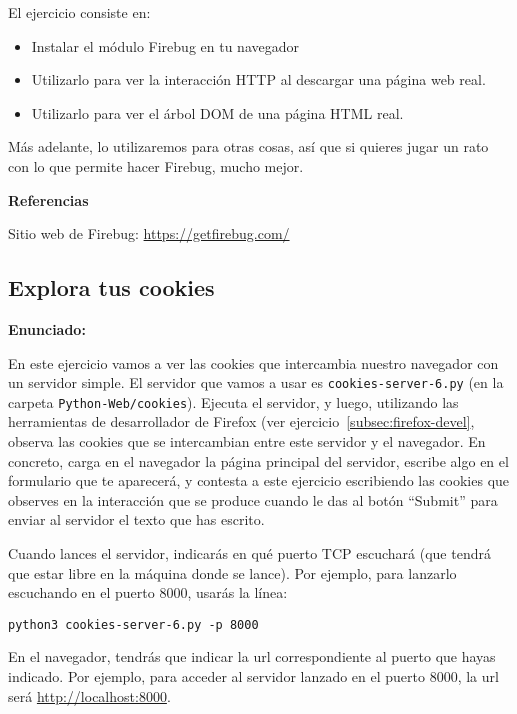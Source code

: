 El ejercicio consiste en:

\begin{itemize}
\item Instalar el módulo Firebug en tu navegador
\item Utilizarlo para ver la interacción HTTP al descargar una página web real.
\item Utilizarlo para ver el árbol DOM de una página HTML real.
\end{itemize}

Más adelante, lo utilizaremos para otras cosas, así que si quieres jugar un rato con lo que permite hacer Firebug, mucho mejor.

\textbf{Referencias}

Sitio web de Firebug: \url{https://getfirebug.com/}


\subsection{Explora tus cookies}
\label{subsec:explora-cookies}

\textbf{Enunciado:}

En este ejercicio vamos a ver las cookies que intercambia nuestro navegador con un servidor simple. El servidor que vamos a usar es \verb|cookies-server-6.py| (en la carpeta \verb|Python-Web/cookies|). Ejecuta el servidor, y luego, utilizando las herramientas de desarrollador de Firefox (ver ejercicio~\ref{subsec:firefox-devel}, observa las cookies que se intercambian entre este servidor y el navegador. En concreto, carga en el navegador la página principal del servidor, escribe algo en el formulario que te aparecerá, y contesta a este ejercicio escribiendo las cookies que observes en la interacción que se produce cuando le das al botón ``Submit'' para enviar al servidor el texto que has escrito.

Cuando lances el servidor, indicarás en qué puerto TCP escuchará (que tendrá que estar libre en la máquina donde se lance). Por ejemplo, para lanzarlo escuchando en el puerto 8000, usarás la línea:

\begin{verbatim}
python3 cookies-server-6.py -p 8000
\end{verbatim}

En el navegador, tendrás que indicar la url correspondiente al puerto que hayas indicado. Por ejemplo, para acceder al servidor lanzado en el puerto 8000, la url será \url{http://localhost:8000}.

